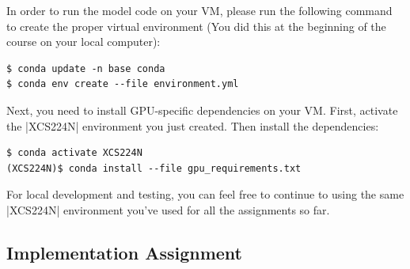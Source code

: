 In order to run the model code on your VM, please run the following command to create the proper virtual environment (You did this at the beginning of the course on your local computer):

\begin{lstlisting}
$ conda update -n base conda
$ conda env create --file environment.yml
\end{lstlisting}

Next, you need to install GPU-specific dependencies on your VM.  First, activate the |XCS224N| environment you just created.  Then install the dependencies:

\begin{lstlisting}
$ conda activate XCS224N
(XCS224N)$ conda install --file gpu_requirements.txt
\end{lstlisting}

For local development and testing, you can feel free to continue to using the same |XCS224N| environment you've used for all the assignments so far.

\subsection*{Implementation Assignment}

